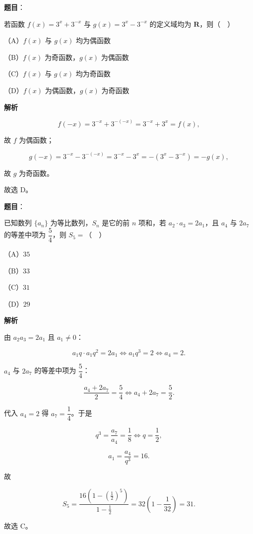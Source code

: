 \begin{answer}

\textbf{题目}：

若函数 $f(x)=3^x+3^{-x}$ 与 $g(x)=3^x-3^{-x}$ 的定义域均为 $\mathbf R$，则（　）

（A）$f(x)$ 与 $g(x)$ 均为偶函数

（B）$f(x)$ 为奇函数，$g(x)$ 为偶函数

（C）$f(x)$ 与 $g(x)$ 均为奇函数

（D）$f(x)$ 为偶函数，$g(x)$ 为奇函数

\textbf{解析}

\nopagebreak[4]
\[f(-x)=3^{-x}+3^{-(-x)}=3^{-x}+3^x=f(x),\]

故 $f$ 为偶函数；

\nopagebreak[4]
\[g(-x)=3^{-x}-3^{-(-x)}=3^{-x}-3^x=-(3^x-3^{-x})=-g(x),\]

故 $g$ 为奇函数。

故选 D。


\end{answer}
\begin{answer}

\textbf{题目}：

已知数列 $\{a_n\}$ 为等比数列，$S_n$ 是它的前 $n$ 项和，若 $a_2\cdot a_3=2a_1$，且 $a_4$ 与 $2a_7$ 的等差中项为 $\dfrac54$，则 $S_5=$（　）

（A）$35$

（B）$33$

（C）$31$

（D）$29$

\textbf{解析}

由 $a_2a_3=2a_1$ 且 $a_1\neq0$：

\nopagebreak[4]
\[a_1q\cdot a_1q^2=2a_1\iff a_1q^3=2\iff a_4=2.\]

$a_4$ 与 $2a_7$ 的等差中项为 $\dfrac54$：

\nopagebreak[4]
\[\frac{a_4+2a_7}{2}=\frac54\iff a_4+2a_7=\frac52.\]

代入 $a_4=2$ 得 $a_7=\dfrac14$。于是

\nopagebreak[4]
\[q^3=\frac{a_7}{a_4}=\frac18\iff q=\frac12,\]

\nopagebreak[4]
\[a_1=\frac{a_4}{q^3}=16.\]

故

\nopagebreak[4]
\[S_5=\frac{16\left(1-\left(\frac12\right)^5\right)}{1-\frac12}
=32\left(1-\frac1{32}\right)=31.\]

故选 C。


\end{answer}
